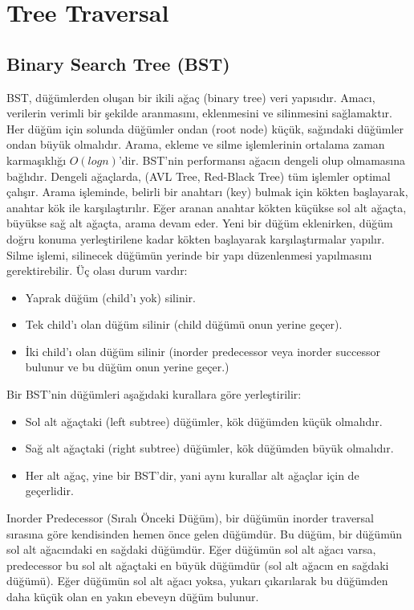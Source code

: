 \section{Tree Traversal}

\subsection{Binary Search Tree (BST)}

BST, düğümlerden oluşan bir ikili ağaç (binary tree) veri yapısıdır. Amacı, verilerin verimli bir şekilde aranmasını, eklenmesini ve silinmesini sağlamaktır. Her düğüm için solunda düğümler ondan (root node) küçük, sağındaki düğümler ondan büyük olmalıdır. Arama, ekleme ve silme işlemlerinin ortalama zaman karmaşıklığı $O(logn)$'dir. BST'nin performansı ağacın dengeli olup olmamasına bağlıdır. Dengeli ağaçlarda, (AVL Tree, Red-Black Tree) tüm işlemler optimal çalışır. Arama işleminde, belirli bir anahtarı (key) bulmak için kökten başlayarak, anahtar kök ile karşılaştırılır. Eğer aranan anahtar kökten küçükse sol alt ağaçta, büyükse sağ alt ağaçta, arama devam eder. Yeni bir düğüm eklenirken, düğüm doğru konuma yerleştirilene kadar kökten başlayarak karşılaştırmalar yapılır. Silme işlemi, silinecek düğümün yerinde bir yapı düzenlenmesi yapılmasını gerektirebilir. Üç olası durum vardır:

\begin{itemize}
    \item Yaprak düğüm (child'ı yok) silinir.
    \item Tek child'ı olan düğüm silinir (child düğümü onun yerine geçer).
    \item İki child'ı olan düğüm silinir (inorder predecessor veya inorder successor bulunur ve bu düğüm onun yerine geçer.)
\end{itemize}

Bir BST'nin düğümleri aşağıdaki kurallara göre yerleştirilir:

\begin{itemize}
    \item Sol alt ağaçtaki (left subtree) düğümler, kök düğümden küçük olmalıdır.
    \item Sağ alt ağaçtaki (right subtree) düğümler, kök düğümden büyük olmalıdır.
    \item Her alt ağaç, yine bir BST'dir, yani aynı kurallar alt ağaçlar için de geçerlidir.
\end{itemize}

Inorder Predecessor (Sıralı Önceki Düğüm), bir düğümün inorder traversal sırasına göre kendisinden hemen önce gelen düğümdür. Bu düğüm, bir düğümün sol alt ağacındaki en sağdaki düğümdür. Eğer düğümün sol alt ağacı varsa, predecessor bu sol alt ağaçtaki en büyük düğümdür (sol alt ağacın en sağdaki düğümü). Eğer düğümün sol alt ağacı yoksa, yukarı çıkarılarak bu düğümden daha küçük olan en yakın ebeveyn düğüm bulunur.

